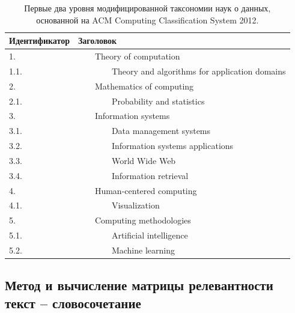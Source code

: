 \documentclass[12pt]{article}
\begin{document}
\begin{table}
	\def\arraystretch{1.}
	\centering
	\begin{tabular}{|l|l|}
		\hline
		Идентификатор & Заголовок                                             \\
		\hline
		1.             & ~~~~Theory of computation                             \\
		1.1.           & ~~~~~~~~Theory and algorithms for application domains \\
		2.             & ~~~~Mathematics of computing                          \\
		2.1.           & ~~~~~~~~Probability and statistics                    \\
		3.             & ~~~~Information systems                               \\
		3.1.           & ~~~~~~~~Data management systems                       \\
		3.2.           & ~~~~~~~~Information systems applications              \\
		3.3.           & ~~~~~~~~World Wide Web                                \\
		3.4.           & ~~~~~~~~Information retrieval                         \\
		4.             & ~~~~Human-centered computing                          \\
		4.1.           & ~~~~~~~~Visualization                                 \\
		5.             & ~~~~Computing methodologies                           \\
		5.1.           & ~~~~~~~~Artificial intelligence                       \\
		5.2.           & ~~~~~~~~Machine learning                              \\
		\hline
	\end{tabular}
	\label{table:acm_higher_ranks}
	\caption{Первые два уровня модифицированной таксономии наук о данных, основанной на ACM Computing Classification System 2012.}
\end{table}

	
\subsection{Метод и вычисление матрицы релевантности текст -- словосочетание}
\end{document}
